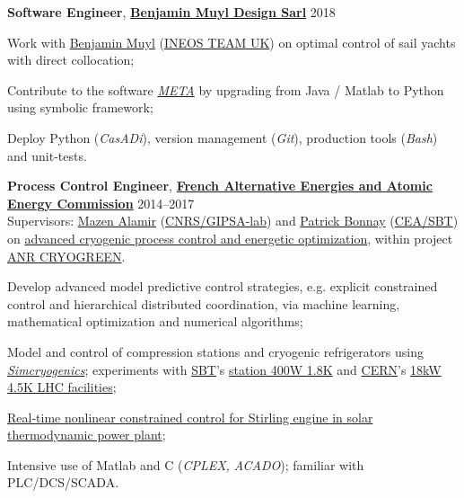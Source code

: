 \documentclass[a4paper,11pt]{article}
\begin{document}
	\vspace{0.1cm}
	
	\textbf{Software Engineer}, \href{https://www.bmuyl.com/}{\textbf{Benjamin Muyl Design Sarl}}
	\hfill {2018} 
	\begin{innerlist}
		\item Work with \href{https://www.linkedin.com/in/bmuyl/}{Benjamin Muyl}  (\href{https://www.ineosteamuk.com/}{INEOS TEAM UK}) on optimal control of sail yachts with direct collocation;
		\item Contribute to the software \href{https://pole-mer-bretagne-atlantique.com/en/component/projects/project/2235}{\emph{META}} by upgrading from Java / Matlab to Python using symbolic framework; 
		\item Deploy Python (\emph{CasADi}), version management (\emph{Git}), production tools (\emph{Bash}) and unit-tests.
	\end{innerlist}
	
	\vspace{0.1cm}
	
	\textbf{Process Control Engineer}, \href{http://www.cea.fr/}{\textbf{French Alternative Energies and Atomic Energy Commission}} 
	\hfill {2014--2017} \\
	Supervisors: \href{http://www.mazenalamir.fr/home/}{Mazen Alamir} (\href{http://www.cnrs.fr/}{CNRS/GIPSA-lab}) and \href{https://www.researchgate.net/profile/P_Bonnay}{Patrick Bonnay} (\href{http://www.d-sbt.fr/en}{CEA/SBT}) on \href{https://vuongvtrinh.github.io/project/cryogenic-refrigerator/}{advanced cryogenic process control and energetic optimization}, within project \href{https://anr.fr/Project-ANR-13-SEED-0005}{ANR CRYOGREEN}.
	\begin{innerlist}
		\item Develop advanced model predictive control strategies, e.g. explicit constrained control and hierarchical distributed coordination, via machine learning, mathematical optimization and numerical algorithms;
		\item Model and control of compression stations and cryogenic refrigerators using \href{http://www.d-sbt.fr/en/Pages/News/2016_Francois-Bonne.aspx}{\emph{Simcryogenics}}; experiments with \href{http://www.d-sbt.fr/en}{SBT}'s \href{http://inac.cea.fr/en/Phocea/Vie_des_labos/Ast/ast_visu.php?id_ast=771}{station 400W 1.8K} and \href{https://cern.ch}{CERN}'s \href{https://cds.cern.ch/record/708291}{18kW 4.5K LHC facilities};
		\item \href{https://vuongvtrinh.github.io/project/solar-energy/}{Real-time nonlinear constrained control for Stirling engine in solar thermodynamic power plant};
		\item Intensive use of Matlab and C (\emph{CPLEX, ACADO}); familiar with PLC/DCS/SCADA.
	\end{innerlist}
	
\end{document}

